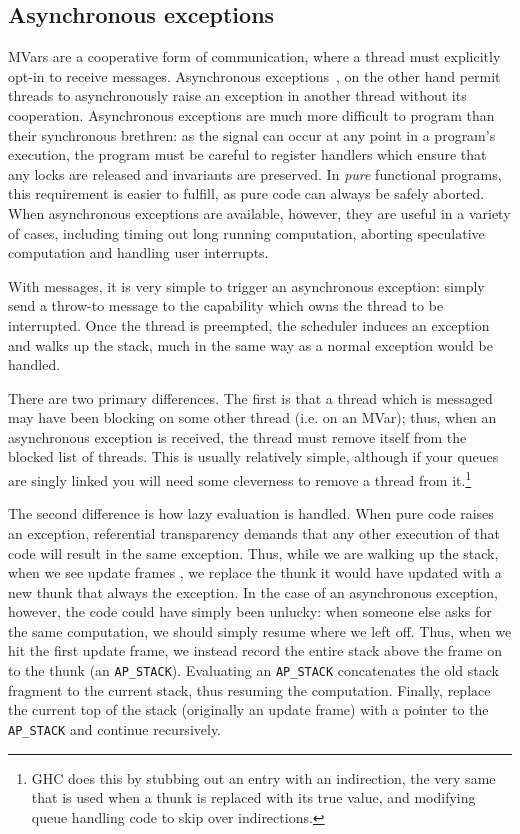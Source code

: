 \subsection{Asynchronous exceptions}

MVars are a cooperative form of communication, where a thread must
explicitly opt-in to receive messages.  Asynchronous
exceptions~\cite{Marlow:2001:AEH:378795.378858}, on the other hand
permit threads to asynchronously raise an exception in another thread
without its cooperation.  Asynchronous exceptions are much more
difficult to program than their synchronous brethren: as the signal can
occur at any point in a program's execution, the program must be careful
to register handlers which ensure that any locks are released and
invariants are preserved.  In \emph{pure} functional programs, this requirement
is easier to fulfill, as pure code can always be safely aborted.  When
asynchronous exceptions are available, however, they are useful
in a variety of cases, including timing out long running computation,
aborting speculative computation and handling user interrupts.

With messages, it is very simple to trigger an asynchronous exception:
simply send a throw-to message to the capability which owns the thread
to be interrupted.  Once the thread is preempted, the scheduler induces
an exception and walks up the stack, much in the same way as a normal
exception would be handled.

There are two primary differences.  The first is that a thread which
is messaged may have been blocking on some other thread (i.e. on an MVar);
thus, when an asynchronous exception is received, the thread must remove itself
from the blocked list of threads.  This is usually relatively simple, although
if your queues are singly linked you will need some cleverness to remove
a thread from it.\footnote{GHC does this by stubbing out an entry with an
indirection, the very same that is used when a thunk is replaced with its
true value, and modifying queue handling code to skip over indirections.}

The second difference is how lazy evaluation is handled. When pure code
raises an exception, referential transparency demands that any other
execution of that code will result in the same exception.  Thus, while
we are walking up the stack, when we see update frames ,
we replace the thunk it would have updated with a new thunk that always
the exception.  In the case of an asynchronous exception, however, the
code could have simply been unlucky: when someone else asks for the same
computation, we should simply resume where we left off.  Thus, when we
hit the first update frame, we instead record the entire stack above the
frame on to the thunk (an \verb|AP_STACK|).  Evaluating an
\verb|AP_STACK| concatenates the old stack fragment to the current
stack, thus resuming the computation.  Finally, replace the current top
of the stack (originally an update frame) with a pointer to the
\verb|AP_STACK| and continue recursively. 

